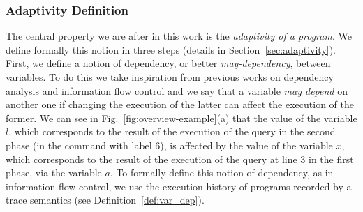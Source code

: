 \subsubsection{Adaptivity Definition}
\label{sec:adaptivity-informal}

The central property we are after in this work is the \emph{adaptivity of a program}. We define formally this notion in three steps (details in Section~\ref{sec:adaptivity}). First, we define a notion of dependency, or better \emph{may-dependency}, between variables. To do this we take inspiration from previous works on dependency analysis and information flow control and we say that a variable \emph{may depend} on another one if changing the execution of the latter can affect the execution of the former. 
We can see in Fig.~\ref{fig:overview-example}(a) that the value of the variable $l$, which corresponds to the result of the execution of the query in the second phase (in the command with label 6), is affected by the value of the variable $x$, which corresponds to the result of the execution of the query at line 3 in the first phase, via the variable $a$.
To formally define this notion of dependency, as in information flow control, we use the execution history of programs recorded by a trace semantics (see Definition~\ref{def:var_dep}).

